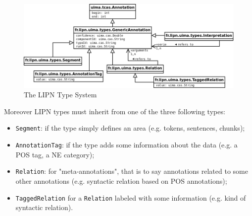 \documentclass{article}
\newenvironment{xitemize}{
\begin{itemize}
  \setlength{\itemsep}{.3\baselineskip}
  \setlength{\topsep}{0pt}
  \setlength{\parskip}{0pt}
  \setlength{\parsep}{0pt}
}{\end{itemize}}
\begin{document}
\begin{figure}[htbp]
\begin{center}
\includegraphics[width=\linewidth]{TS/TS07.png}
\end{center}
\caption{The LIPN Type System \label{fig-LIPN-TS}}
\end{figure}


Moreover LIPN types must inherit from  one of the three following types:
\begin{xitemize}
\item {\tt Segment}: if the type simply defines an area (e.g. tokens, sentences, chunks);
\item {\tt AnnotationTag}: if the type adds some information about the data (e.g. a POS tag, a NE category);
\item {\tt Relation}: for "meta-annotations", that is to say annotations related to some other annotations (e.g. syntactic relation based on POS annotations);
\item {\tt TaggedRelation} for a {\tt Relation} labeled with some information (e.g. kind of syntactic relation).
\end{xitemize}
\end{document}
